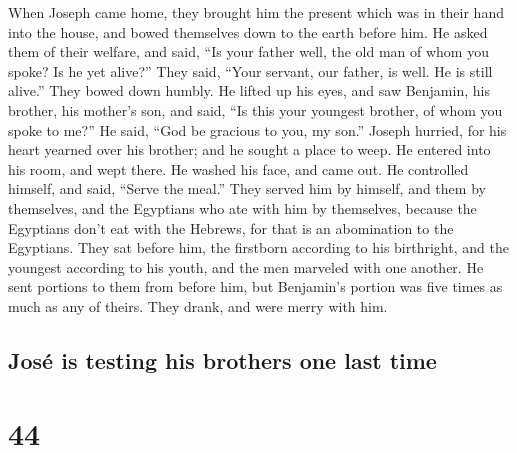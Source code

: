  When Joseph came home, they brought him the present
which was in their hand into the house, and bowed themselves down to the
earth before him.  He asked them of their welfare, and
said, ``Is your father well, the old man of whom you spoke? Is he yet
alive?''  They said, ``Your servant, our father, is well.
He is still alive.'' They bowed down humbly.  He lifted
up his eyes, and saw Benjamin, his brother, his mother's son, and said,
``Is this your youngest brother, of whom you spoke to me?'' He said,
``God be gracious to you, my son.''  Joseph hurried, for
his heart yearned over his brother; and he sought a place to weep. He
entered into his room, and wept there.  He washed his
face, and came out. He controlled himself, and said, ``Serve the meal.''
 They served him by himself, and them by themselves, and
the Egyptians who ate with him by themselves, because the Egyptians
don't eat with the Hebrews, for that is an abomination to the Egyptians.
 They sat before him, the firstborn according to his
birthright, and the youngest according to his youth, and the men
marveled with one another.  He sent portions to them from
before him, but Benjamin's portion was five times as much as any of
theirs. They drank, and were merry with him.

\hypertarget{josuxe9-is-testing-his-brothers-one-last-time}{%
\subsection{José is testing his brothers one last
time}\label{josuxe9-is-testing-his-brothers-one-last-time}}

\hypertarget{section-43}{%
\section{44}\label{section-43}}

